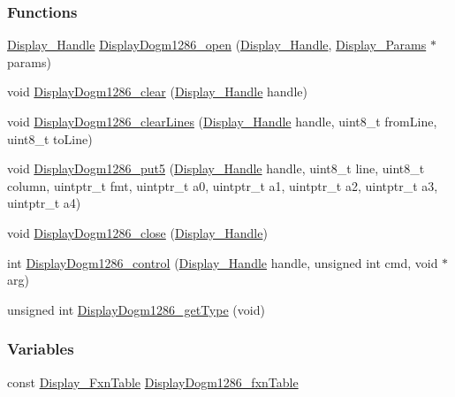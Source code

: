 \subsubsection*{Functions}
\begin{DoxyCompactItemize}
\item 
\hyperlink{_display_8h_a045a26811755aabf1886d982c49e54ab}{Display\+\_\+\+Handle} \hyperlink{_display_dogm1286_8h_a4c7a1aa2af584f06ad1ff1ee72e54642}{Display\+Dogm1286\+\_\+open} (\hyperlink{_display_8h_a045a26811755aabf1886d982c49e54ab}{Display\+\_\+\+Handle}, \hyperlink{struct_display___params}{Display\+\_\+\+Params} $\ast$params)
\item 
void \hyperlink{_display_dogm1286_8h_a71691cd65dfc4e2958127a24d86d0e1b}{Display\+Dogm1286\+\_\+clear} (\hyperlink{_display_8h_a045a26811755aabf1886d982c49e54ab}{Display\+\_\+\+Handle} handle)
\item 
void \hyperlink{_display_dogm1286_8h_a3f1cb817259d4bde56d2bfafa686c104}{Display\+Dogm1286\+\_\+clear\+Lines} (\hyperlink{_display_8h_a045a26811755aabf1886d982c49e54ab}{Display\+\_\+\+Handle} handle, uint8\+\_\+t from\+Line, uint8\+\_\+t to\+Line)
\item 
void \hyperlink{_display_dogm1286_8h_ad389ba8187ab364ac1be546ecdc2db12}{Display\+Dogm1286\+\_\+put5} (\hyperlink{_display_8h_a045a26811755aabf1886d982c49e54ab}{Display\+\_\+\+Handle} handle, uint8\+\_\+t line, uint8\+\_\+t column, uintptr\+\_\+t fmt, uintptr\+\_\+t a0, uintptr\+\_\+t a1, uintptr\+\_\+t a2, uintptr\+\_\+t a3, uintptr\+\_\+t a4)
\item 
void \hyperlink{_display_dogm1286_8h_a16baf7b6fd4bd7b8be9592f00a2eb54f}{Display\+Dogm1286\+\_\+close} (\hyperlink{_display_8h_a045a26811755aabf1886d982c49e54ab}{Display\+\_\+\+Handle})
\item 
int \hyperlink{_display_dogm1286_8h_a39ef449adc9aa5322f24bd5750311bcd}{Display\+Dogm1286\+\_\+control} (\hyperlink{_display_8h_a045a26811755aabf1886d982c49e54ab}{Display\+\_\+\+Handle} handle, unsigned int cmd, void $\ast$arg)
\item 
unsigned int \hyperlink{_display_dogm1286_8h_ab8314e4631d8ee4a9f71b1f0dd0c1c0c}{Display\+Dogm1286\+\_\+get\+Type} (void)
\end{DoxyCompactItemize}
\subsubsection*{Variables}
\begin{DoxyCompactItemize}
\item 
const \hyperlink{struct_display___fxn_table}{Display\+\_\+\+Fxn\+Table} \hyperlink{_display_dogm1286_8h_a0fe13f03cd4fc79e290221fd2b86d4cf}{Display\+Dogm1286\+\_\+fxn\+Table}
\end{DoxyCompactItemize}


